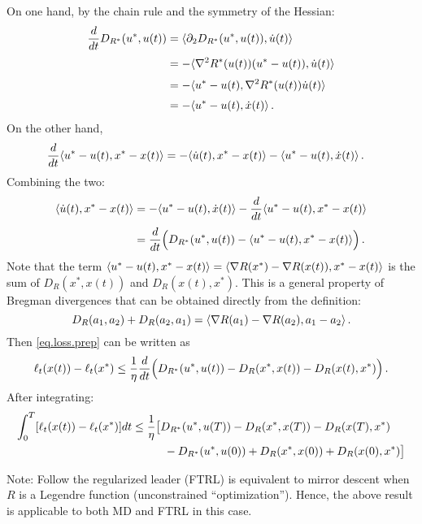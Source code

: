 \documentclass[12pt]{article}
\theoremstyle{plain}
\theoremstyle{definition}
\theoremstyle{remark}
\begin{document}
On one hand, by the chain rule and the symmetry of the Hessian:
\begin{align*}
\frac{d}{dt} D_{R^{*}}(u^{*}, u(t))
&= \langle { \partial_{2} D_{R^{*}}(u^{*}, u(t)), \dot{u}(t)}\rangle \\[1mm]
&= - \langle { \nabla^2 R^{*}(u(t))(u^{*} -u(t)), \dot{u}(t) }\rangle \\[1mm]
&= - \langle { u^{*} -u(t), \nabla^2 R^{*}(u(t)) \dot{u}(t) }\rangle \\[1mm]
&= - \langle {u^{*} - u(t), \dot{x}(t)}\rangle\,.
\end{align*}
On the other hand,
\begin{align*}
\frac{d}{dt} \langle {u^{*} - u(t), x^{*} - x(t)}\rangle
&= - \langle { \dot{u}(t), x^{*} - x(t)}\rangle - \langle { u^{*} -u(t), \dot{x}(t) }\rangle\,.
\end{align*}
Combining the two:
\begin{align*}
\langle { \dot{u}(t), x^{*} - x(t)}\rangle
&= - \langle { u^{*} -u(t), \dot{x}(t) }\rangle - \frac{d}{dt} \langle {u^{*} - u(t), x^{*} - x(t)}\rangle \\[1mm]
&= \frac{d}{dt} \Bigl( D_{R^{*}}(u^{*}, u(t)) - \langle {u^{*} - u(t), x^{*} - x(t)}\rangle \Bigr)\,.
\end{align*}
Note that the term
$\langle {u^{*} - u(t), x^{*} - x(t)}\rangle = \langle {\nabla R(x^{*}) - \nabla R(x(t)), x^{*} - x(t)}\rangle$
is the sum of $D_{R}(x^{*}, x(t))$ and $D_{R}(x(t), x^{*})$.
This is a general property of Bregman divergences that can be obtained directly from the definition:
$$
D_{R}(a_{1}, a_{2}) + D_{R}(a_{2}, a_{1})
= \langle {\nabla R(a_{1}) - \nabla R(a_{2}), a_{1} - a_{2}}\rangle\,.
$$
Then \eqref{eq.loss.prep} can be written as
\begin{equation*}
\ell_{t}(x(t)) - \ell_{t}(x^{*})
\leq  \frac{1}{\eta} \frac{d}{dt} \Bigl( D_{R^{*}}(u^{*}, u(t)) - D_{R}(x^{*}, x(t)) - D_{R}(x(t), x^{*})\Bigr)\,.
\end{equation*}
After integrating:
\begin{align*}
\int_{0}^{T} [\ell_{t}(x(t)) - \ell_{t}(x^{*})] dt
&\leq \frac{1}{\eta} \bigl[ D_{R^{*}}(u^{*}, u(T)) - D_{R}(x^{*}, x(T)) - D_{R}(x(T), x^{*}) \\
&\hspace{10mm}- D_{R^{*}}(u^{*}, u(0)) + D_{R}(x^{*}, x(0)) + D_{R}(x(0), x^{*}) \bigr]
\end{align*}

Note: Follow the regularized leader (FTRL) is equivalent to mirror descent when $R$ is a Legendre function
(unconstrained ``optimization'').
Hence, the above result is applicable to both MD and FTRL in this case.
\end{document}
